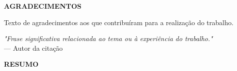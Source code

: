\newpage{} \thispagestyle{empty}

\begin{flushright}
\vspace*{\fill}
\hspace*{0.5\textwidth}
\begin{minipage}{0.5\textwidth}
{\fontsize{12}{14}\selectfont
\justifying
{}
}
\end{minipage}
\end{flushright}

\newpage{} \thispagestyle{empty}

\begin{center}

\textbf{AGRADECIMENTOS}

\end{center}

Texto de agradecimentos aos que contribuíram para a realização do trabalho.

\newpage{} \thispagestyle{empty}

\vspace*{\fill}

\begin{flushright}
\textit{"Frase significativa relacionada ao tema ou à experiência do trabalho."}\\
— Autor da citação
\end{flushright}

\newpage{} \thispagestyle{empty}

\begin{center}

\textbf{RESUMO}

\end{center}

